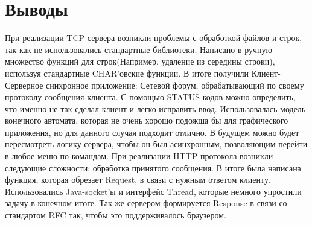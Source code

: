 \documentclass[a4paper,12pt]{extarticle}
\begin{document}
\section{Выводы}
При реализации TCP сервера возникли проблемы с обработкой файлов и строк, так как не использовались стандартные библиотеки. Написано в ручную множество функций для строк(Например, удаление из середины строки), используя стандартные CHAR'овские функции. В итоге получили Клиент-Серверное синхронное приложение: Сетевой форум, обрабатывающий по своему протоколу сообщения клиента. С помощью STATUS-кодов можно определить, что именно не так сделал клиент и легко исправить ввод. Использовалась модель конечного автомата, которая не очень хорошо подожша бы для графического приложения, но для данного случая подходит отлично. В будущем можно будет пересмотреть логику сервера, чтобы он был асинхронным, позволяющим перейти в любое меню по командам.
\newline
При реализации HTTP протокола возникли следующие сложности: обработка принятого сообщения. В итоге была написана функция, которая обрезает Request, в связи с нужным ответом клиенту. Использовались Java-socket'ы и интерфейс Thread, которые немного упростили задачу в конечном итоге. Так же сервером формируется Response в связи со стандартом RFC так, чтобы это поддерживалось браузером.
\end{document}
